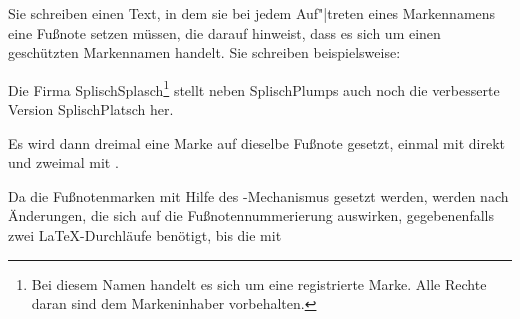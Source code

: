   \begin{Example}
    Sie schreiben einen Text, in dem sie bei jedem Auf"|treten eines
    Markennamens eine Fußnote setzen müssen, die darauf hinweist, dass es sich
    um einen geschützten Markennamen handelt. Sie schreiben beispielsweise:%
    \IfThisCommonLabelBase{maincls}{\iftrue}{\csname iffalse\endcsname}%
\begin{lstcode}
  Die Firma SplischSplasch\footnote{Bei diesem
    Namen handelt es sich um eine registrierte
    Marke. Alle Rechte daran sind dem
    Markeninhaber vorbehalten.\label{refnote}}
  stellt neben SplischPlumps
  auch noch die verbesserte Version
  SplischPlatsch her.
\end{lstcode}
      Es wird dann dreimal eine Marke auf dieselbe Fußnote gesetzt, einmal mit
       direkt und zweimal mit
      .
    \else\iftrue
\begin{lstcode}
  Die Firma SplischSplasch\footnote{Bei diesem
    Namen handelt es sich um eine registrierte
    Marke. Alle Rechte daran sind dem
    Markeninhaber vorbehalten.\label{refnote}}
  stellt neben SplischPlumps\footref{refnote}
  auch noch die verbesserte Version
  SplischPlatsch\footref{refnote} her.
\end{lstcode}
        Es wird dann dreimal eine Marke auf dieselbe Fußnote gesetzt, einmal
        mit \DescRef{\ThisCommonLabelBase.cmd.footnote} direkt und zweimal mit
        \Macro{footref}.
      \else
\begin{lstcode}
  Die Firma SplischSplasch\footnote{Bei diesem
    Namen handelt es sich um eine registrierte
    Marke. Alle Rechte daran sind dem
    Markeninhaber, der Firma SplischSplasch,
    vorbehalten.\label{refnote}}
  stellt neben SplischPlumps\footref{refnote}
  auch noch die verbesserte Version
  SplischPlatsch\footref{refnote} und das sehr
  beliebte
  SplischSplaschPlumps\footref{refnote} her.
\end{lstcode}
        Es wird dann vier Mal eine Marke auf dieselbe Fußnote gesetzt, einmal
        mit \DescRef{\ThisCommonLabelBase.cmd.footnote} direkt und drei Mal
        mit \Macro{footref}.
      \fi%
    \fi
  \end{Example}
\fi
Da die Fußnotenmarken mit Hilfe des -Mechanismus gesetzt werden,
werden nach Änderungen, die sich auf die Fußnotennummerierung auswirken,
gegebenenfalls zwei \LaTeX-Durchläufe benötigt, bis die mit 
